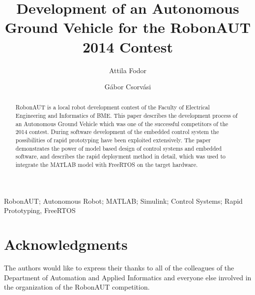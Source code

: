 \documentclass[twoside,b5paper,10pt]{article}
\title{Development of an Autonomous Ground Vehicle for the RobonAUT 2014 Contest}
\author{Attila Fodor \and Gábor Csorvási}
\begin{document}
\makeAutStyleTitle


\begin{abstract}
RobonAUT is a local robot development contest of the Faculty of Electrical Engineering and Informatics of BME. This paper describes the development process of an Autonomous Ground Vehicle which was one of the successful competitors of the 2014 contest. During software development of the embedded control system the possibilities of rapid prototyping have been exploited extensively. The paper demonstrates the power of model based design of control systems and embedded software, and describes the rapid deployment method in detail, which was used to integrate the MATLAB model with FreeRTOS on the target hardware.
\end{abstract}


\begin{keywords}
RobonAUT; Autonomous Robot; MATLAB; Simulink; Control Systems; Rapid Prototyping, FreeRTOS
\end{keywords}






\section*{Acknowledgments}


 { \small The authors would like to express their thanks to all of the colleagues of the Department of Automation and Applied Informatics and everyone else involved in the organization of the RobonAUT competition. }

%

\end{document}
